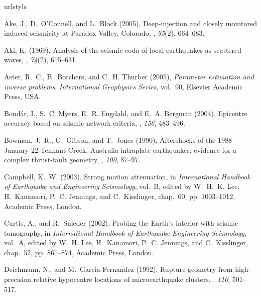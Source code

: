 \documentclass[12pt,double]{article}
\begin{document}
\begin{thebibliography}{45}
\providecommand{\natexlab}[1]{#1}
\expandafter\ifx\csname urlstyle\endcsname\relax
  \providecommand{\doi}[1]{doi:\discretionary{}{}{}#1}\else
  \providecommand{\doi}{doi:\discretionary{}{}{}\begingroup
  \urlstyle{rm}\Url}\fi

Ake, J., D.~O'{C}onnell, and L.~Block (2005), Deep-injection and closely
  monitored induced seismicity at {P}aradox {V}alley, {C}olorado,
  \bssa, \textit{95}(2),
  664--683.

Aki, K. (1969), Analysis of the seismic coda of local earthquakes as scattered
  waves, \jgr, \textit{74}(2), 615--631.

Aster, R.~C., B.~Borchers, and C.~H. Thurber (2005), \textit{Parameter
  estimation and inverse problems}, \textit{International Geophysics Series},
  vol.~90, Elsevier Academic Press, USA.

Bond\'ar, I., S.~C. Myers, E.~R. Engdahl, and E.~A. Bergman (2004), Epicentre
  accuracy based on seismic network criteria, \gji, \textit{156}, 483--496.

Bowman, J.~R., G.~Gibson, and T.~Jones (1990), Aftershocks of the 1988
  {J}anuary 22 {T}ennant {C}reek, {A}ustralia intraplate earthquakes: evidence
  for a complex thrust-fault geometry, \gji, \textit{100}, 87--97.

Campbell, K.~W. (2003), Strong motion attenuation, in \textit{International
  Handbook of Earthquake and Engineering Seismology}, vol.~B, edited by
  W.~H.~K. Lee, H.~Kanamori, P.~C. Jennings, and C.~Kisslinger, chap.~60, pp.
  1003--1012, Academic Press, London.

Curtis, A., and R.~Snieder (2002), Probing the {E}arth's interior with seismic
  tomography, in \textit{International Handbook of Earthquake Engineering
  Seismology}, vol.~{A}, edited by W.~H. Lee, H.~Kanamori, P.~C. Jennings, and
  C.~Kisslinger, chap.~52, pp. 861--874, Academic Press, London.

Deichmann, N., and M.~Garcia-{F}ernandez (1992), Rupture geometry from
  high-precision relative hypocentre locations of microearthquake clusters,
  \gji, \textit{110}, 501--517.


\end{thebibliography}
\end{document}

